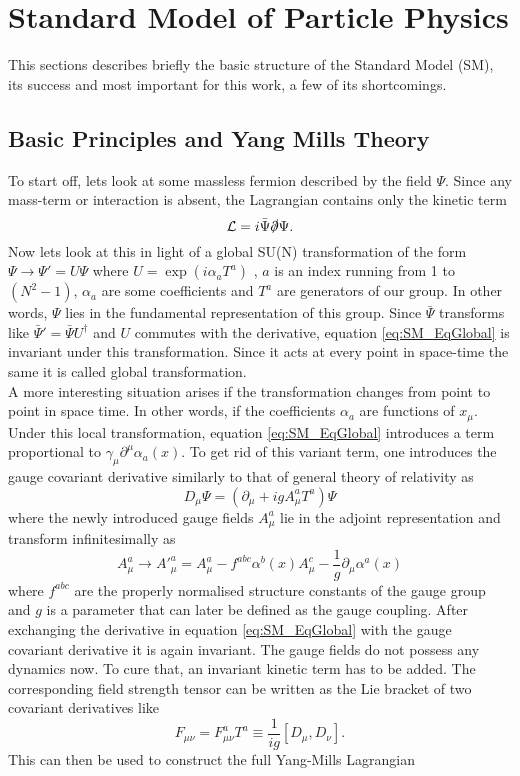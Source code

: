 \chapter{Standard Model of Particle Physics}
\label{ch:sm}
This sections describes briefly the basic structure of the Standard Model (SM), its success and most important for this work, a few of its shortcomings.
\section{Basic Principles and Yang Mills Theory}
To start off, lets look at some massless fermion described by the field $\Psi$. Since any mass-term or interaction is absent, the Lagrangian contains only the kinetic term 
\begin{equation}
\label{eq:SM_EqGlobal}
\mathcal{L}= i\bar{\Psi}\slashed{\partial} \Psi .
\end{equation}
Now lets look at this in light of a global SU(N) transformation of the form 
$\Psi \rightarrow \Psi'=U\Psi$ where $U=\exp\left(i\alpha_aT^a\right)$ , $a$ is an index running from 1 to $(N^2-1)$, $\alpha_a$ are some coefficients and $T^a$ are generators of our group. In other words, $\Psi$ lies in the fundamental representation of this group. Since $\bar{\Psi}$ transforms like $\bar{\Psi}'=\bar{\Psi}U^\dagger$ and $U$ commutes with the derivative, equation \ref{eq:SM_EqGlobal} is invariant under this transformation. Since it acts at every point in space-time the same it is called global transformation.\\
A more interesting situation arises if the transformation changes from point to point in space time. In other words, if the coefficients $\alpha_a$ are functions of $x_\mu$. Under this local transformation, equation \ref{eq:SM_EqGlobal} introduces a term proportional to $\gamma_\mu\partial^\mu \alpha_a(x)$.
To get rid of this variant term, one introduces the gauge covariant derivative similarly to that of general theory of relativity as
\begin{equation}
D_\mu\Psi=(\partial_\mu+igA^a_\mu T^a)\Psi
\end{equation}
where the newly introduced gauge fields $A_\mu^a$ lie in the adjoint representation and transform infinitesimally as
\begin{equation}
A_\mu^a \rightarrow {A'}_\mu^a=A_\mu^a-f^{abc}\alpha^b(x)A_\mu^c-\frac{1}{g}\partial_\mu \alpha^a(x)
\end{equation}
where $f^{abc}$ are the properly normalised structure constants of the gauge group and $g$ is a parameter that can later be defined as the gauge coupling. After exchanging the derivative in equation \ref{eq:SM_EqGlobal} with the gauge covariant derivative it is again invariant. The gauge fields do not possess any dynamics now. To cure that, an invariant kinetic term has to be added.
The corresponding field strength tensor can be written as the Lie bracket of two covariant derivatives like
\begin{equation}
F_{\mu\nu}=F^a_{\mu\nu}T^a \equiv \frac{1}{ig}\left[ D_\mu,D_\nu\right] .
\end{equation}
This can then be used to construct the full Yang-Mills Lagrangian

